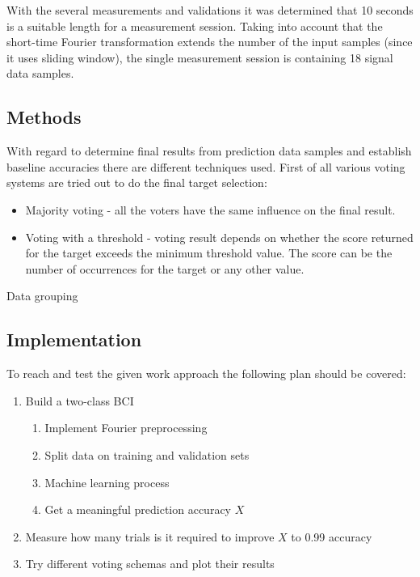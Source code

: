 \documentclass[12pt]{article}
\begin{document}
With the several measurements and validations it was determined that 10 seconds is a suitable length for a measurement session. Taking into account that the short-time Fourier transformation extends the number of the input samples (since it uses sliding window), the single measurement session is containing 18 signal data samples.

\subsection{Methods}
With regard to determine final results from prediction data samples and establish baseline accuracies there are different techniques used. First of all various voting systems are tried out to do the final target selection:
\begin{itemize}
\item Majority voting - all the voters have the same influence on the final result.
\item Voting with a threshold - voting result depends on whether the score returned for the target exceeds the minimum threshold value. The score can be the number of occurrences for the target or any other value.
\end{itemize}

Data grouping


\subsection{Implementation}

To reach and test the given work approach the following plan should be covered:
\begin{enumerate}
\item Build a two-class BCI 
\begin{enumerate}
\item Implement Fourier preprocessing
\item Split data on training and validation sets
\item Machine learning process
\item Get a meaningful prediction accuracy $X$
\end{enumerate}
\item Measure how many trials is it required to improve $X$ to 0.99 accuracy
\item Try different voting schemas and plot their results
\end{enumerate}
\end{document}
